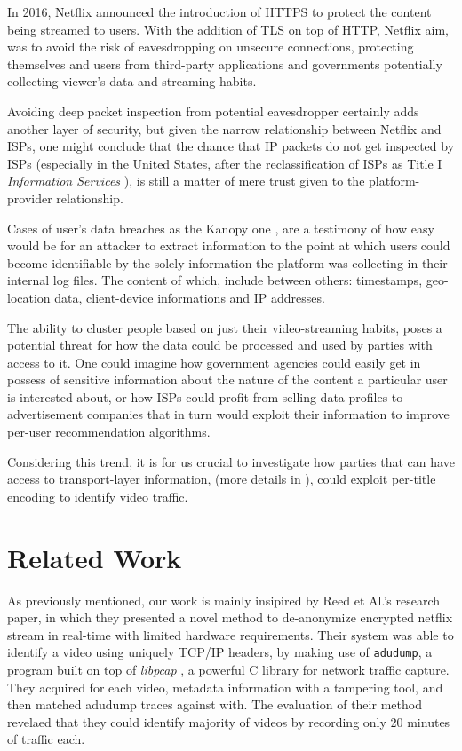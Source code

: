 In 2016, Netflix announced the introduction of HTTPS to protect the content
being streamed to users. With the addition of TLS on top of HTTP, Netflix aim,
was to avoid the risk of eavesdropping on unsecure connections, protecting
themselves and users from third-party applications and governments potentially
collecting viewer's data and streaming habits.

Avoiding deep packet inspection from potential eavesdropper certainly adds
another layer of security, but given the narrow relationship between Netflix
and ISPs, one might conclude that the chance that IP packets do not get
inspected by ISPs (especially in the United States, after the reclassification
of ISPs as Title I \emph{Information Services} \cite{net-neutrality}), is still
a matter of mere trust given to the platform-provider relationship.

Cases of user's data breaches as the Kanopy one \cite{kanopy}, are a testimony
of how easy would be for an attacker to extract information to the point at
which users could become identifiable by the solely information the platform
was collecting in their internal log files. The content of which, include
between others: timestamps, geo-location data, client-device informations and
IP addresses. 

The ability to cluster people based on just their video-streaming habits, poses
a potential threat for how the data could be processed and used by parties with
access to it. One could imagine how government agencies could easily get in
possess of sensitive information about the nature of the content a particular
user is interested about, or how ISPs could profit from selling data profiles
to advertisement companies that in turn would exploit their information to
improve per-user recommendation algorithms.

Considering this trend, it is for us crucial to investigate how parties that
can have access to transport-layer information, (more details in
), could exploit per-title encoding to identify video
traffic. 

\section{Related Work}\label{related}

As previously mentioned, our work is mainly insipired by Reed et Al.'s
\cite{netflix-real-time} research paper, in which they presented a novel method
to de-anonymize encrypted netflix stream in real-time with limited hardware
requirements. Their system was able to identify a video using uniquely TCP/IP
headers, by making use of \texttt{adudump}, a program built on top of
\emph{libpcap} \cite{libpcap}, a powerful C library for network traffic
capture. They acquired for each video, metadata information with a tampering
tool, and then matched adudump traces against with. The evaluation of their
method revelaed that they could identify majority of videos by recording only
20 minutes of traffic each.

